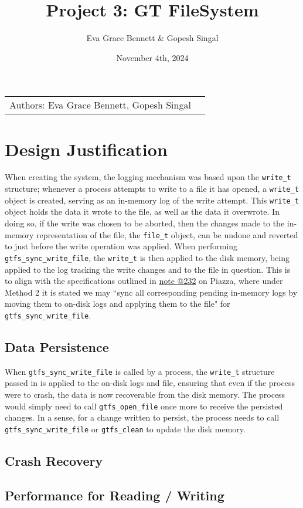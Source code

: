 \documentclass{article}
\title{Project 3: GT FileSystem
}
\author{Eva Grace Bennett \& Gopesh Singal}
\date{November 4th, 2024}
\begin{document}
\maketitle

\noindent\begin{tabular}{@{}ll}
    Authors: Eva Grace Bennett, Gopesh Singal
\end{tabular}

\section*{Design Justification}
When creating the system, the logging mechanism was based upon the \texttt{write\_t} structure; whenever a process attempts to write to a file it has opened, a \texttt{write\_t} object is created, serving as an in-memory log of the write attempt. This \texttt{write\_t} object holds the data it wrote to the file, as well as the data it overwrote. In doing so, if the write was chosen to be aborted, then the changes made to the in-memory representation of the file, the \texttt{file\_t} object, can be undone and reverted to just before the write operation was applied. When performing \texttt{gtfs\_sync\_write\_file}, the \texttt{write\_t} is then applied to the disk memory, being applied to the log tracking the write changes and to the file in question. This is to align with the specifications outlined in \href{https://piazza.com/class/m00d9edry1e5xc/post/232}{note @232} on Piazza, where under Method 2 it is stated we may ``sync all corresponding pending in-memory logs by moving them to on-disk logs and applying them to the file" for \texttt{gtfs\_sync\_write\_file}.
\subsection*{Data Persistence}
When \texttt{gtfs\_sync\_write\_file} is called by a process, the \texttt{write\_t} structure passed in is applied to the on-disk logs and file, ensuring that even if the process were to crash, the data is now recoverable from the disk memory. The process would simply need to call \texttt{gtfs\_open\_file} once more to receive the persisted changes. In a sense, for a change written to persist, the process needs to call \texttt{gtfs\_sync\_write\_file} or \texttt{gtfs\_clean} to update the disk memory. 
\subsection*{Crash Recovery}
\subsection*{Performance for Reading / Writing}
\end{document}
